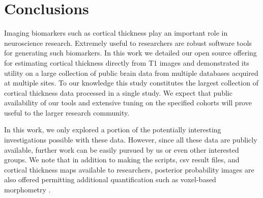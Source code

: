 \section{Conclusions}

Imaging biomarkers such as cortical thickness play an 
important role in neuroscience research.  Extremely useful to
researchers are robust software tools for generating such 
biomarkers.  In this work we detailed our open source offering for estimating
cortical thickness directly from T1 images and demonstrated
its utility on a large collection of public brain data from
multiple databases acquired at multiple sites.  To our knowledge
this study constitutes the largest collection of cortical
thickness data processed in a single study.  
We expect that public availability of our tools and extensive tuning on 
the specified cohorts will prove useful to the larger
research community.  

In this work, we only explored a portion of the potentially
interesting investigations possible with these data.  However,
since all these data are publicly available, further work can
be easily pursued by us or even other interested groups.  We 
note that in addition to making the scripts, csv result files,
and cortical thickness maps available to researchers, 
posterior probability images are also offered permitting additional
quantification such as voxel-based morphometry \cite{ashburner2000}.

